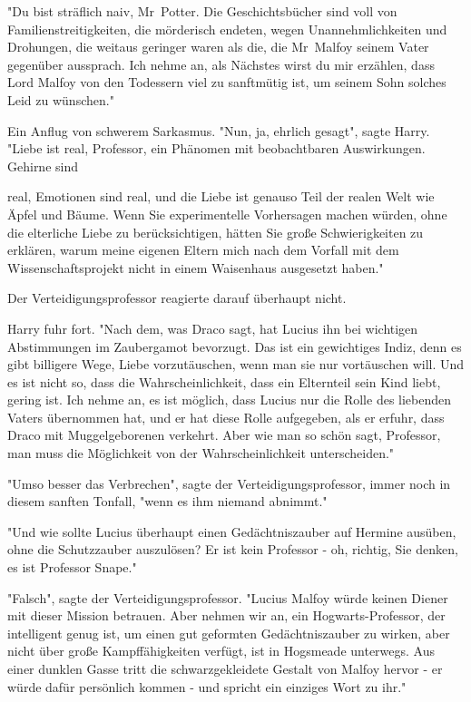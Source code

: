 {"Du bist sträflich naiv, Mr~Potter. Die Geschichtsbücher sind voll von Familienstreitigkeiten, die mörderisch endeten, wegen Unannehmlichkeiten und Drohungen, die weitaus geringer waren als die, die Mr~Malfoy seinem Vater gegenüber aussprach. Ich nehme an, als Nächstes wirst du mir erzählen, dass Lord Malfoy von den Todessern viel zu sanftmütig ist, um seinem Sohn solches Leid zu wünschen."

Ein Anflug von schwerem Sarkasmus. "Nun, ja, ehrlich gesagt", sagte Harry. "Liebe ist real, Professor, ein Phänomen mit beobachtbaren Auswirkungen. Gehirne sind

real, Emotionen sind real, und die Liebe ist genauso Teil der realen Welt wie Äpfel und Bäume. Wenn Sie experimentelle Vorhersagen machen würden, ohne die elterliche Liebe zu berücksichtigen, hätten Sie große Schwierigkeiten zu erklären, warum meine eigenen Eltern mich nach dem Vorfall mit dem Wissenschaftsprojekt nicht in einem Waisenhaus ausgesetzt haben."

Der Verteidigungsprofessor reagierte darauf überhaupt nicht.

Harry fuhr fort. "Nach dem, was Draco sagt, hat Lucius ihn bei wichtigen Abstimmungen im Zaubergamot bevorzugt. Das ist ein gewichtiges Indiz, denn es gibt billigere Wege, Liebe vorzutäuschen, wenn man sie nur vortäuschen will. Und es ist nicht so, dass die Wahrscheinlichkeit, dass ein Elternteil sein Kind liebt, gering ist. Ich nehme an, es ist möglich, dass Lucius nur die Rolle des liebenden Vaters übernommen hat, und er hat diese Rolle aufgegeben, als er erfuhr, dass Draco mit Muggelgeborenen verkehrt. Aber wie man so schön sagt, Professor, man muss die Möglichkeit von der Wahrscheinlichkeit unterscheiden."

"Umso besser das Verbrechen", sagte der Verteidigungsprofessor, immer noch in diesem sanften Tonfall, "wenn es ihm niemand abnimmt."

"Und wie sollte Lucius überhaupt einen Gedächtniszauber auf Hermine ausüben, ohne die Schutzzauber auszulösen? Er ist kein Professor - oh, richtig, Sie denken, es ist Professor Snape."

"Falsch", sagte der Verteidigungsprofessor. "Lucius Malfoy würde keinen Diener mit dieser Mission betrauen. Aber nehmen wir an, ein Hogwarts-Professor, der intelligent genug ist, um einen gut geformten Gedächtniszauber zu wirken, aber nicht über große Kampffähigkeiten verfügt, ist in Hogsmeade unterwegs. Aus einer dunklen Gasse tritt die schwarzgekleidete Gestalt von Malfoy hervor - er würde dafür persönlich kommen - und spricht ein einziges Wort zu ihr."

}
